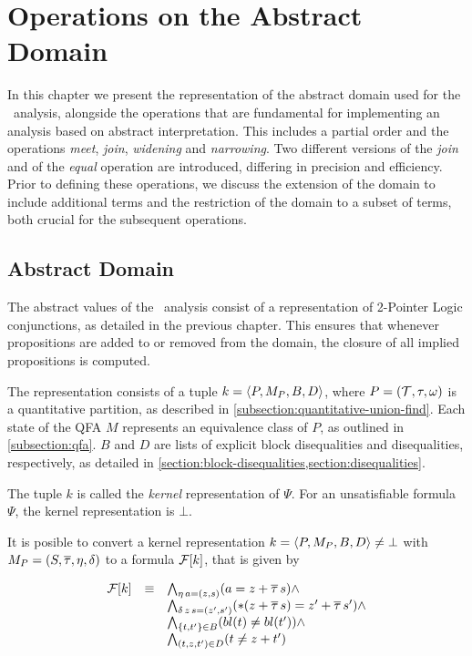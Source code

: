 \chapter{Operations on the Abstract Domain}

In this chapter we present the representation of the abstract domain used for the \cpo\ analysis, alongside the operations that are fundamental for implementing an analysis based on abstract interpretation.
This includes a partial order and the operations \emph{meet}, \emph{join}, \emph{widening} and \emph{narrowing}.
Two different versions of the \emph{join} and of the \emph{equal} operation are introduced,
differing in precision and efficiency.
Prior to defining these operations, we discuss the extension of the domain to include additional terms and the restriction of the domain to a subset of terms,
both crucial for the subsequent operations.

\section{Abstract Domain}
The abstract values of the \cpo\ analysis consist of a representation
of 2-Pointer Logic conjunctions, as detailed in the previous chapter.
This ensures that whenever propositions are added to or removed from the domain,
the closure of all implied propositions is computed.

The representation consists of a tuple $k = \langle P,M_P,B,D\rangle$,
where $P = (\mathcal{T}, \tau, \omega)$ is a quantitative partition, as described in \cref{subsection:quantitative-union-find}.
Each state of the QFA $M$ represents an equivalence class of $P$, as outlined in \cref{subsection:qfa}.
$B$ and $D$ are lists of explicit block disequalities and disequalities, respectively, as detailed in \cref{section:block-disequalities,section:disequalities}.

The tuple $k$ is called the \emph{kernel} representation of $\Psi$.
For an unsatisfiable formula $\Psi$, the kernel representation is $\bot$.

It is posible to convert a kernel representation $k = \langle P,M_P,B,D\rangle \neq \bot$ with $M_P = (S, \overline{\tau}, \eta, \delta)$ to a formula $\mathcal{F}[k]$, that is given by

\[
    \begin{array}{lll}
        \mathcal{F}[k] & \equiv & \bigwedge_{\eta\,a=(z,s)} (a = z + \overline{\tau}\,s) \land                        \\
              &        & \bigwedge_{\delta\,z\,s=(z',s')} (*(z + \overline{\tau}\,s) = z' + \overline{\tau}\,s') \land \\
              &        & \bigwedge_{\{t, t'\} \in B} (bl(t) \neq bl(t')) \land                     \\
              &        & \bigwedge_{(t, z, t') \in D} (t \neq z + t')
    \end{array}
\]

